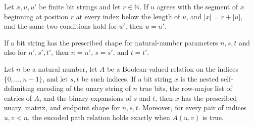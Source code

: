 \begin{lemma}
\label{Complexity.plainAt_unique}
\leanok
{}
Let $x,u,u'$ be finite bit strings and let $r\in\mathbb{N}$. If $u$ agrees with the
segment of $x$ beginning at position $r$ at every index below the length of $u$, and
$|x|=r+|u|$, and the same two conditions hold for $u'$, then $u=u'$.
\end{lemma}

\begin{theorem}
\label{Complexity.ushape_unique}
\leanok
{}
If a bit string has the prescribed shape for natural-number parameters $n,s,t$ and also
for $n',s',t'$, then $n=n'$, $s=s'$, and $t=t'$.
\end{theorem}

\begin{lemma}
\label{Complexity.ushape_of_eq}
\leanok
{}
Let $n$ be a natural number, let $A$ be a Boolean-valued relation on the indices
$\{0,\ldots,n-1\}$, and let $s,t$ be such indices. If a bit string $x$ is the nested
self-delimiting encoding of the unary string of $n$ true bits, the row-major list of
entries of $A$, and the binary expansions of $s$ and $t$, then $x$ has the prescribed
unary, matrix, and endpoint shape for $n,s,t$. Moreover, for every pair of indices
$u,v<n$, the encoded path relation holds exactly when $A(u,v)$ is true.
\end{lemma}

